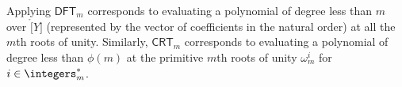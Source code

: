 Applying $\mathsf{DFT}_m$ corresponds to evaluating a polynomial of degree less than $m$ over $\ring[Y]$ (represented by the vector of coefficients in the natural order) at all the $m$th roots of unity. Similarly, $\mathsf{CRT}_m$ corresponds to evaluating a polynomial of degree less than $\phi(m)$ at the primitive $m$th roots of unity $\omega_{m}^i$ for $i \in \integers_{m}^{*}$.






